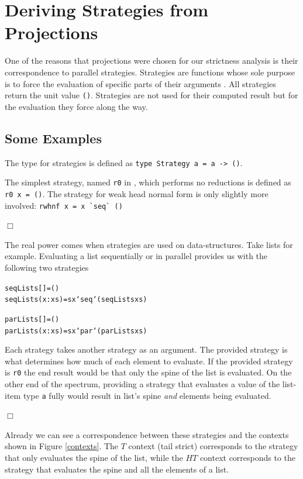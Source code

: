 %
%
\section{Deriving Strategies from Projections} \label{sec:proAndStrat} One of
the reasons that projections were chosen for our strictness analysis is their
correspondence to parallel strategies.  Strategies are functions whose sole
purpose is to force the evaluation of specific parts of their arguments
\citep{marlow2010seq, strategies}. All strategies return the unit value
\verb-()-. Strategies are not used for their computed result but for the
evaluation they force along the way.

\subsection*{Some Examples}

The type for strategies is defined as \verb`type Strategy a = a -> ()`.

The simplest strategy, named \verb-r0- in \citep{marlow2010seq}, which performs
no reductions is defined as \verb-r0 x = ()-. The strategy for weak head normal
form is only slightly more involved: \verb-rwhnf x = x `seq` ()-

\hfill$\Box$

The real power comes when strategies are used on data-structures. Take
lists for example. Evaluating a list sequentially or in parallel provides us
with the following two strategies

\begin{alltt}
    seqList s []     = ()
    seqList s (x:xs) = s x `seq` (seqList s xs)

    parList s []     = ()
    parList s (x:xs) = s x `par` (parList s xs)
\end{alltt}

Each strategy takes another strategy as an argument. The provided
strategy is what determines how much of each element to evaluate. If the provided
strategy is \verb-r0- the end result would be that only the spine of the list is
evaluated. On the other end of the spectrum, providing a strategy that evaluates a value
of the list-item type \verb-a- fully would result in list's spine \emph{and} elements being evaluated.

\hfill$\Box$

Already we can see a correspondence between these strategies and the contexts shown
in Figure \ref{contexts}. The $T$ context (tail strict) corresponds to the strategy
that only evaluates the spine of the list, while the $HT$ context corresponds to the
strategy that evaluates the spine and all the elements of a list.

